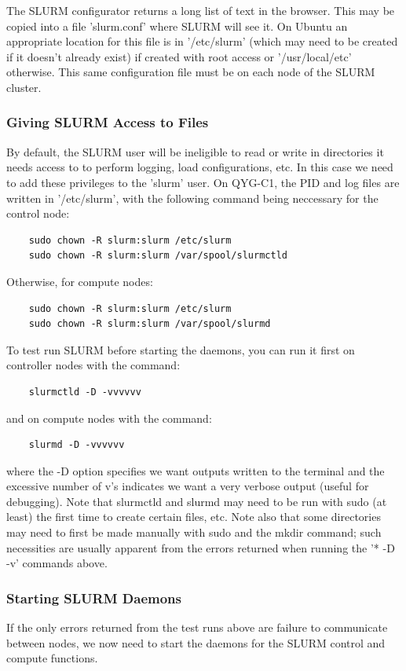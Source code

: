 \documentclass[]{article}
\begin{document}
The SLURM configurator returns a long list of text in the browser. This may be copied into a file 'slurm.conf' where SLURM will see it. On Ubuntu an appropriate location for this file is in '/etc/slurm' (which may need to be created if it doesn't already exist) if created with root access  or '/usr/local/etc' otherwise. This same configuration file must be on each node of the SLURM cluster.

\subsubsection{Giving SLURM Access to Files}
By default, the SLURM user will be ineligible to read or write in directories it needs access to to perform logging, load configurations, etc. In this case we need to add these privileges to the 'slurm' user. On QYG-C1, the PID and log files are written in '/etc/slurm', with the following command being neccessary for the control node:
\begin{verbatim}
	sudo chown -R slurm:slurm /etc/slurm
	sudo chown -R slurm:slurm /var/spool/slurmctld
\end{verbatim}
Otherwise, for compute nodes:
\begin{verbatim}
	sudo chown -R slurm:slurm /etc/slurm
	sudo chown -R slurm:slurm /var/spool/slurmd
\end{verbatim}
To test run SLURM before starting the daemons, you can run it first on controller nodes with the command:
\begin{verbatim}
	slurmctld -D -vvvvvv
\end{verbatim}
and on compute nodes with the command:
\begin{verbatim}
	slurmd -D -vvvvvv
\end{verbatim}
where the -D option specifies we want outputs written to the terminal and the excessive number of v's indicates we want a very verbose output (useful for debugging). Note that slurmctld and slurmd may need to be run with sudo (at least) the first time to create certain files, etc. Note also that some directories may need to first be made manually with sudo and the mkdir command; such necessities are usually apparent from the errors returned when running the '* -D -v' commands above.

\subsubsection{Starting SLURM Daemons}
If the only errors returned from the test runs above are failure to communicate between nodes, we now need to start the daemons for the SLURM control and compute functions.
\end{document}
